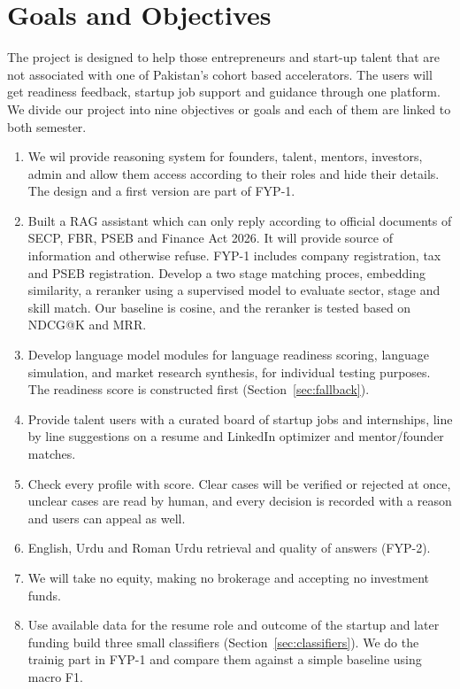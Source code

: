 \documentclass{FastFyp}
\begin{document}
\section{Goals and Objectives}\label{sec:goals}
The project is designed to help those entrepreneurs and start-up talent that are not associated with one of Pakistan's cohort based accelerators. The users will get readiness feedback, startup job support and guidance through one platform. We divide  our project into nine objectives or goals and each of them are linked to both semester.
\begin{enumerate}
\item We wil provide reasoning system for founders, talent, mentors, investors, admin and allow them access according to their roles and hide their details. The design and a first version are part of FYP-1.
\item Built a RAG assistant which can only reply according to official documents of SECP, FBR, PSEB and Finance Act 2026. It will provide source of information and otherwise refuse. FYP-1 includes company registration, tax and PSEB registration.
Develop a two stage matching proces, embedding similarity, a reranker using a supervised model to evaluate sector, stage and skill match. Our baseline is cosine, and the reranker is tested based on NDCG@K and MRR.
\item Develop language model modules for language readiness scoring, language simulation, and market research synthesis, for individual testing purposes. The readiness score is constructed first (Section~\ref{sec:fallback}).
\item Provide talent users with a curated board of startup jobs and internships, line by line suggestions on a resume and LinkedIn optimizer and mentor/founder matches.
\item Check every profile with score. Clear cases will be verified or rejected at once, unclear cases are read by human, and every decision is recorded with a reason and users can appeal as well.
\item English, Urdu and Roman Urdu retrieval and quality of answers (FYP-2).
\item We will take no equity, making no brokerage and accepting no  investment funds.
\item Use available data for the resume role and outcome of the startup and later funding build three small classifiers (Section~\ref{sec:classifiers}).  We do the trainig part in FYP-1 and compare them against a simple baseline using macro F1.
\end{enumerate}
\end{document}
